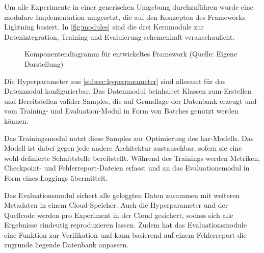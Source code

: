 Um alle Experimente in einer generischen Umgebung durchzuführen wurde eine modulare Implementation umgesetzt, die auf den Konzepten des Frameworks Lightning \cite{Falcon19} basiert.
In \autoref{fig:modules} sind die drei Kernmodule zur Datenintegration, Training und Evaluierung schemenhaft veranschaulicht.

\begin{figure}
    \centering
    \caption[Komponentendiagramm für entwickeltes Framework]{Komponentendiagramm für entwickeltes Framework (Quelle: Eigene Darstellung)}
    \label{fig:modules}
\end{figure}

Die Hyperparameter aus \autoref{subsec:hyperparameter} sind allesamt für das Datenmodul konfigurierbar.
Das Datenmodul beinhaltet Klassen zum Erstellen und Bereitstellen valider Samples, die auf Grundlage der Datenbank erzeugt und vom Training- und Evaluation-Modul in Form von Batches genutzt werden können.

Das Trainingsmodul nutzt diese Samples zur Optimierung des \gls{har}-Modells.
Das Modell ist dabei gegen jede andere Architektur austauschbar, sofern sie eine wohl-definierte Schnittstelle bereitstellt.
Während des Trainings werden Metriken, Checkpoint- und Fehlerreport-Dateien erfasst und an das Evaluationsmodul in Form eines Loggings übermittelt.

Das Evaluationsmodul sichert alle geloggten Daten zusammen mit weiteren Metadaten in einem Cloud-Speicher.
Auch die Hyperparameter und der Quellcode werden pro Experiment in der Cloud gesichert, sodass sich alle Ergebnisse eindeutig reproduzieren lassen.
Zudem hat das Evaluationsmodule eine Funktion zur Verifikation und kann basierend auf einem Fehlerreport die zugrunde liegende Datenbank anpassen.
